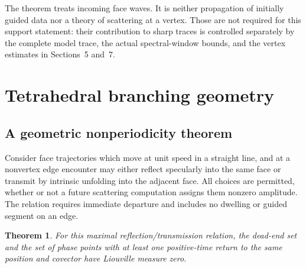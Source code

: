 \documentclass[11pt]{amsart}
\numberwithin{equation}{section}
\newtheorem{theorem}{Theorem}[section]
\theoremstyle{remark}
\begin{document}
The theorem treats incoming face waves. It is neither propagation of initially guided data nor a theory of scattering at a vertex. Those are not required for this support statement: their contribution to sharp traces is controlled separately by the complete model trace, the actual spectral-window bounds, and the vertex estimates in Sections~5 and~7.

\section{Tetrahedral branching geometry}\label{sec:geometry}

\subsection{A geometric nonperiodicity theorem}
Consider face trajectories which move at unit speed in a straight line, and at a nonvertex edge encounter may either reflect specularly into the same face or transmit by intrinsic unfolding into the adjacent face. All choices are permitted, whether or not a future scattering computation assigns them nonzero amplitude. The relation requires immediate departure and includes no dwelling or guided segment on an edge.

\begin{theorem}\label{thm:nonperiodic}
For this maximal reflection/transmission relation, the dead-end set and the set of phase points with at least one positive-time return to the same position and covector have Liouville measure zero.
\end{theorem}
\end{document}
